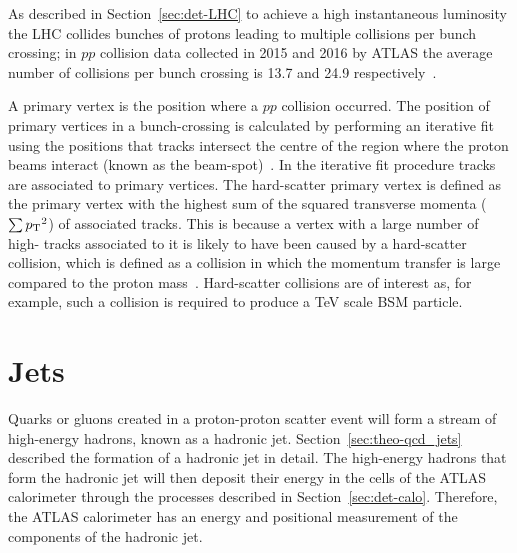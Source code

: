 As described in Section~\ref{sec:det-LHC} to achieve a high instantaneous luminosity the LHC collides bunches of protons leading to multiple collisions per bunch crossing;
in $pp$ collision data collected in 2015 and 2016 by ATLAS the average number of collisions per bunch crossing is 13.7 and 24.9 respectively~\cite{det-ATLAS_lumi_twiki}.

A primary vertex is the position where a $pp$ collision occurred.
The position of primary vertices in a bunch-crossing is calculated by performing
an iterative fit using the positions that tracks intersect the centre of the region where the proton beams interact (known as the beam-spot)~\cite{obj-tracks_pv}.
In the iterative fit procedure tracks are associated to primary vertices.
The hard-scatter primary vertex is defined as the primary vertex with the highest sum of the squared transverse momenta ($\sum {\ensuremath{p_{\mathrm{T}}}}^2$) of associated tracks.
This is because a vertex with a large number of high-\pT{} tracks associated to it is likely to have been caused by a
hard-scatter collision, which is defined as a collision in which the momentum transfer is large compared to the proton mass~\cite{trig-hard_scatter}.
Hard-scatter collisions are of interest as, for example, such a collision is required to produce a TeV scale BSM particle.

\vspace{-0.5em}
\section{Jets}
\label{sec:obj-jets}

Quarks or gluons created in a proton-proton scatter event
will form a stream of high-energy hadrons, known as a hadronic jet.
Section~\ref{sec:theo-qcd_jets} described the formation of a hadronic jet in detail.
The high-energy hadrons that form the hadronic jet will then deposit their energy in the cells of the ATLAS calorimeter
through the processes described in Section~\ref{sec:det-calo}.
Therefore, the ATLAS calorimeter has an energy and positional measurement of the components of the hadronic jet.



